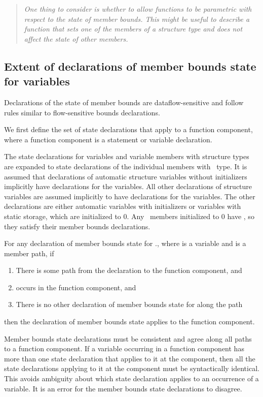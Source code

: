 \begin{quote}
\emph{One thing to consider is whether to allow functions to be
parametric with respect to the state of member bounds. This might be
useful to describe a function that sets one of the members of a
structure type and does not affect the state of other members.}
\end{quote}

\subsection{Extent of declarations of member bounds state for variables}
\label{section:member-bounds-state-extent}

Declarations of the state of member bounds are dataflow-sensitive and
follow rules similar to flow-sensitive bounds declarations.

We first define the set of state declarations that apply to a function
component, where a function component is a statement or
variable declaration.

The state declarations for variables and variable members with structure
types are expanded to state declarations of the individual members with
\arrayptr\ type. It is assumed that declarations of automatic
structure variables without initializers implicitly have 
declarations for the variables. All other declarations of structure
variables are assumed implicitly to have  declarations for the
variables. The other declarations are either automatic variables with
initializers or variables with static storage, which are initialized to
0. Any \arrayptr\ members initialized to 0 have \boundsany, so
they satisfy their member bounds declarations.

For any declaration of member bounds state for ., where
 is a variable and  is a member path, if
\begin{enumerate}
\item
  There is some path from the declaration to the function component, and
\item
   occurs in the function component, and
\item
  There is no other declaration of member bounds state for 
  along the path
\end{enumerate}
then the declaration of member bounds state applies to the function
component.

Member bounds state declarations must be consistent and agree
along all paths to a function component.   If a variable occurring in a
function component has more than one state declaration that applies to
it at the component, then all the state declarations applying to it at
the component must be syntactically identical. This avoids ambiguity
about which state declaration applies to an occurrence of a variable.
It is an error for the member bounds state declarations to disagree.

